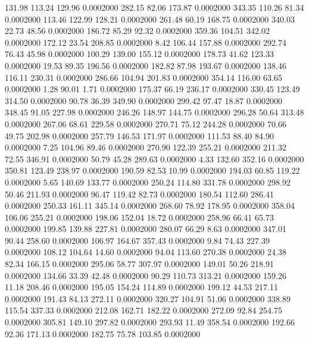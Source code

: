  131.98  113.24  129.96   0.0002000
 282.15   82.06  173.87   0.0002000
 343.35  110.26   81.34   0.0002000
 113.46  122.99  128.21   0.0002000
 261.48   60.19  168.75   0.0002000
 340.03   22.73   48.56   0.0002000
 186.72   85.29   92.32   0.0002000
 359.36  104.51  342.02   0.0002000
 172.12   23.54  208.85   0.0002000
   8.42  106.44  157.88   0.0002000
 292.74   76.43   45.98   0.0002000
 100.29  139.00  155.12   0.0002000
 178.73   41.62  123.33   0.0002000
  19.53   89.35  196.56   0.0002000
 182.82   87.98  193.67   0.0002000
 138.46  116.11  230.31   0.0002000
 286.66  104.94  201.83   0.0002000
 354.14  116.00   63.65   0.0002000
   1.28   90.01    1.71   0.0002000
 175.37   66.19  236.17   0.0002000
 330.45  123.49  314.50   0.0002000
  90.78   36.39  349.90   0.0002000
 299.42   97.47   18.87   0.0002000
 348.45   91.05  227.98   0.0002000
 246.26  148.97  144.75   0.0002000
 296.28   50.64  313.48   0.0002000
 267.06   68.61  229.58   0.0002000
 270.71   75.12  244.28   0.0002000
  70.66   49.75  202.98   0.0002000
 257.79  146.53  171.97   0.0002000
 111.53   88.40   84.90   0.0002000
   7.25  104.96   89.46   0.0002000
 270.90  122.39  255.21   0.0002000
 211.32   72.55  346.91   0.0002000
  50.79   45.28  289.63   0.0002000
   4.33  132.60  352.16   0.0002000
 350.81  123.49  238.97   0.0002000
 190.59   82.53   10.99   0.0002000
 194.03   60.85  119.22   0.0002000
   5.65  140.69  133.77   0.0002000
 250.24  114.80  331.78   0.0002000
 298.92   50.46  211.93   0.0002000
  96.47  119.42   82.73   0.0002000
 180.54  112.60  286.41   0.0002000
 250.33  161.11  345.14   0.0002000
 268.60   78.92  178.95   0.0002000
 358.04  106.06  255.21   0.0002000
 198.06  152.04   18.72   0.0002000
 258.96   66.41   65.73   0.0002000
 199.85  139.88  227.81   0.0002000
 280.07   66.29    8.63   0.0002000
 347.01   90.44  258.60   0.0002000
 106.97  164.67  357.43   0.0002000
   9.84   74.43  227.39   0.0002000
 108.12  104.64   14.60   0.0002000
  94.04  113.60  270.38   0.0002000
  24.38   82.34  166.15   0.0002000
 295.06   58.77  307.97   0.0002000
 149.01   50.26  218.91   0.0002000
 134.66   33.39   42.48   0.0002000
  90.29  110.73  313.21   0.0002000
 159.26   11.18  208.46   0.0002000
 195.05  154.24  114.89   0.0002000
 199.12   44.53  217.11   0.0002000
 191.43   84.13  272.11   0.0002000
 320.27  104.91   51.06   0.0002000
 338.89  115.54  337.33   0.0002000
 212.08  162.71  182.22   0.0002000
 272.09   92.84  254.75   0.0002000
 305.81  149.10  297.82   0.0002000
 293.93   11.49  358.54   0.0002000
 192.66   92.36  171.13   0.0002000
 182.75   75.78  103.85   0.0002000
